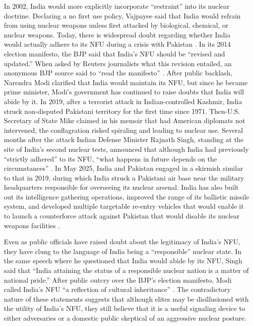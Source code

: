 \documentclass[12pt]{article}
\begin{document}
In 2002, India would more explicitly incorporate “restraint” into its nuclear doctrine. Declaring a no first use policy, Vajpayee said that India would refrain from using nuclear weapons unless first attacked by biological, chemical, or nuclear weapons. Today, there is widespread doubt regarding whether India would actually adhere to its NFU during a crisis with Pakistan \citep{clary_indias_2019, sundaram_india_2018}. In its 2014 election manifesto, the BJP said that India's NFU should be “revised and updated.” When asked by Reuters journalists what this revision entailed, an anonymous BJP source said to “read the manifesto” \citep{sanjeev_miglani_indias_2014}. After public backlash, Narendra Modi clarified that India would maintain its NFU, but since he became prime minister, Modi's government has continued to raise doubts that India will abide by it. In 2019, after a terrorist attack in Indian-controlled Kashmir, India struck non-disputed Pakistani territory for the first time since 1971. Then-U.S. Secretary of State Mike \citet{pompeo_never_2023}
 claimed in his memoir that had American diplomats not intervened, the conflagration risked spiraling and leading to nuclear use. Several months after the attack Indian Defense Minister Rajnath Singh, standing at the site of India's second nuclear tests, announced that although India had previously “strictly adhered” to its NFU, “what happens in future depends on the circumstances” \citep{bagchi_no_2019}. In May 2025, India and Pakistan engaged in a skirmish similar to that in 2019, during which India struck a Pakistani air base near the military headquarters responsible for overseeing its nuclear arsenal. India has also built out its intelligence gathering operations, improved the range of its ballistic missile system, and developed multiple targetable re-entry vehicles that would enable it to launch a counterforce attack against Pakistan that would disable its nuclear weapons facilities \citep{clary_indias_2019}.

Even as public officials have raised doubt about the legitimacy of India's NFU, they have clung to the language of India being a “responsible” nuclear state. In the same speech where he questioned that India would abide by its NFU, Singh said that “India attaining the status of a responsible nuclear nation is a matter of national pride.” After public outcry over the BJP's election manifesto, Modi called India's NFU “a reflection of cultural inheritance” \citep{busvine_indias_2014}. The contradictory nature of these statements suggests that although elites may be disillusioned with the utility of India's NFU, they still believe that it is a useful signaling device to either adversaries or a domestic public skeptical of an aggressive nuclear posture.
\end{document}
